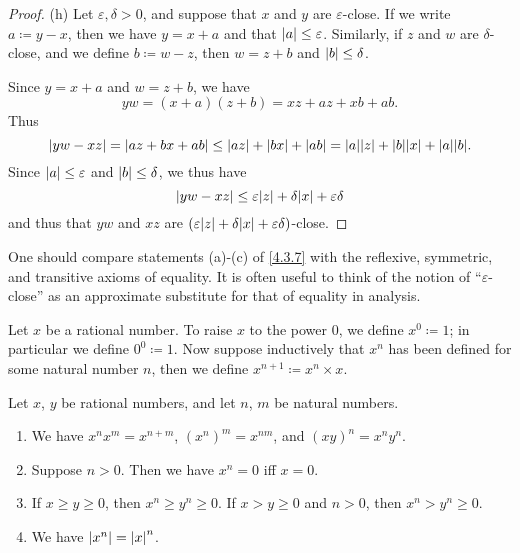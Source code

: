 \begin{proof}{(h)}
  Let \(\varepsilon, \delta > 0\), and suppose that \(x\) and \(y\) are \(\varepsilon\)-close.
  If we write \(a \coloneqq y - x\), then we have \(y = x + a\) and that \(\left\lvert a\right\rvert \leq \varepsilon\).
  Similarly, if \(z\) and \(w\) are \(\delta\)-close, and we define \(b \coloneqq w - z\), then \(w = z + b\) and \(\left\lvert b\right\rvert \leq \delta\).

  Since \(y = x + a\) and \(w = z + b\), we have
  \[
    yw = (x + a)(z + b) = xz + az + xb + ab.
  \]
  Thus
  \[
    \abs{yw - xz} = \abs{az + bx + ab} \leq \abs{az} + \abs{bx} + \abs{ab} = \abs{a}\abs{z} + \abs{b}\abs{x} + \abs{a}\abs{b}.
  \]
  Since \(\left\lvert a\right\rvert \leq \varepsilon\) and \(\left\lvert b\right\rvert \leq \delta\), we thus have
  \[
    \abs{yw - xz} \leq \varepsilon\abs{z} + \delta\abs{x} + \varepsilon\delta
  \]
  and thus that \(yw\) and \(xz\) are \((\varepsilon\abs{z} + \delta\abs{x} + \varepsilon\delta)\)-close.
\end{proof}

\begin{rmk}\label{4.3.8}
  One should compare statements (a)-(c) of \cref{4.3.7} with the reflexive, symmetric, and transitive axioms of equality.
  It is often useful to think of the notion of ``\(\varepsilon\)-close'' as an approximate substitute for that of equality in analysis.
\end{rmk}

\begin{defn}\label{4.3.9}
  Let \(x\) be a rational number.
  To raise \(x\) to the power \(0\), we define \(x^0 \coloneqq 1\);
  in particular we define \(0^0 \coloneqq 1\).
  Now suppose inductively that \(x^n\) has been defined for some natural number \(n\), then we define \(x^{n+1} \coloneqq x^n \times x\).
\end{defn}

\begin{prop}\label{4.3.10}
  Let \(x\), \(y\) be rational numbers, and let \(n\), \(m\) be natural numbers.
  \begin{enumerate}
    \item We have \(x^n x^m = x^{n + m}\), \((x^n)^m = x^{nm}\), and \((xy)^n = x^n y^n\).
    \item Suppose \(n > 0\).
          Then we have \(x^n = 0\) iff \(x = 0\).
    \item If \(x \geq y \geq 0\), then \(x^n \geq y^n \geq 0\).
          If \(x > y \geq 0\) and \(n > 0\), then \(x^n > y^n \geq 0\).
    \item We have \(\left\lvert x^n\right\rvert = \left\lvert x\right\rvert^n\).
  \end{enumerate}
\end{prop}


